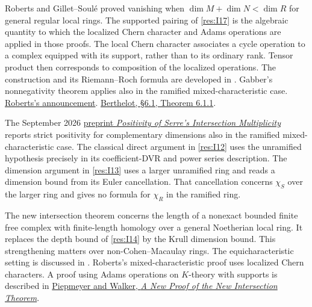 Roberts and Gillet--Soul\'e proved vanishing when
\(\dim M+\dim N<\dim R\) for general regular local rings.
The supported pairing of \ref{res:I17} is the algebraic
quantity to which the localized Chern character and
Adams operations are applied in those proofs. The local
Chern character associates a cycle operation to a
complex equipped with its support, rather than to its
ordinary rank. Tensor product then corresponds to composition
of the localized operations. The construction and its
Riemann--Roch formula are developed in
\cite[Chapter 11 and \S 13.1]{roberts}.
Gabber's nonnegativity theorem applies also in the ramified
mixed-characteristic case.
\href{https://doi.org/10.1090/S0273-0979-1985-15394-7}{Roberts's announcement}.
\href{https://numdam.org/item/SB_1995-1996__38__273_0.pdf}{Berthelot,
\S 6.1, Theorem 6.1.1}.

The September 2026
\href{https://github.com/openai/math/blob/main/preprints/Positivity-of-Serres-Intersection-Multiplicity-September-23-2026/paper.pdf}{preprint
\emph{Positivity of Serre's Intersection Multiplicity}}
reports strict positivity for complementary dimensions
also in the ramified mixed-characteristic case. The classical
direct argument in \ref{res:I12} uses the unramified
hypothesis precisely in its coefficient-DVR and power series
description. The dimension argument in \ref{res:I13}
uses a larger unramified ring and reads a dimension bound
from its Euler cancellation. That cancellation concerns
\(\chi_S\) over the larger ring and gives no formula for
\(\chi_R\) in the ramified ring.

The new intersection theorem concerns the length of a
nonexact bounded finite free complex with finite-length
homology over a general Noetherian local ring. It replaces
the depth bound of \ref{res:I14} by the Krull dimension
bound. This strengthening matters over non-Cohen--Macaulay
rings. The equicharacteristic setting is discussed in
\cite[\S 9.4]{bruns}. Roberts's mixed-characteristic proof
uses localized Chern characters. A proof using Adams
operations on \(K\)-theory with supports is described in
\href{https://arxiv.org/abs/0706.0201}{Piepmeyer and Walker,
\emph{A New Proof of the New Intersection Theorem}}.
